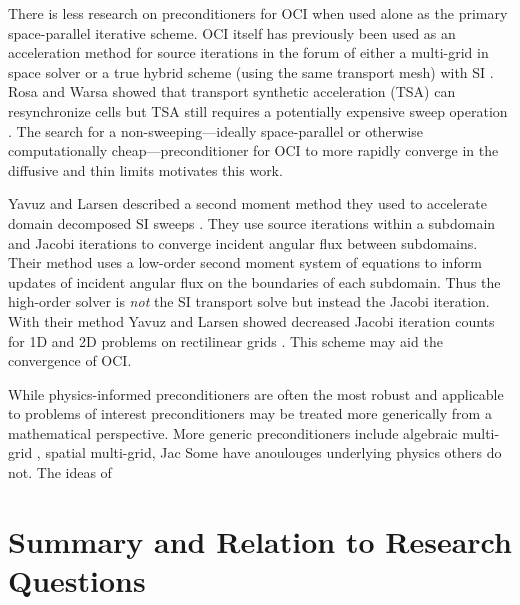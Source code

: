 There is less research on preconditioners for OCI when used alone as the primary space-parallel iterative scheme.
OCI itself has previously been used as an acceleration method for source iterations in the forum of either a multi-grid in space solver \cite{kang2000oci, man1994parallel} or a true hybrid scheme (using the same transport mesh) with SI \cite{hoagland_hybrid_2021}.
Rosa and Warsa showed that transport synthetic acceleration (TSA) can resynchronize cells but TSA still requires a potentially expensive sweep operation \cite{tsa2009rosa}.
The search for a non-sweeping---ideally space-parallel or otherwise computationally cheap---preconditioner for OCI to more rapidly converge in the diffusive and thin limits motivates this work.

Yavuz and Larsen described a second moment method they used to accelerate domain decomposed SI sweeps \cite{yavuz_spatial_1989, yavuz_phd}.
They use source iterations within a subdomain and Jacobi iterations to converge incident angular flux between subdomains.
Their method uses a low-order second moment system of equations to inform updates of incident angular flux on the boundaries of each subdomain.
Thus the high-order solver is \textit{not} the SI transport solve but instead the Jacobi iteration.
With their method Yavuz and Larsen showed decreased Jacobi iteration counts for 1D and 2D problems on rectilinear grids \cite{yavuz_spatial_1989, yavuz_1992_2ddd}.
This scheme may aid the convergence of OCI.

While physics-informed preconditioners are often the most robust and applicable to problems of interest preconditioners may be treated more generically from a mathematical perspective.
More generic preconditioners include algebraic multi-grid \cite{southworth_phd}, spatial multi-grid, Jac
Some have anoulouges underlying physics others do not.
The ideas of 


\section{Summary and Relation to Research Questions}

